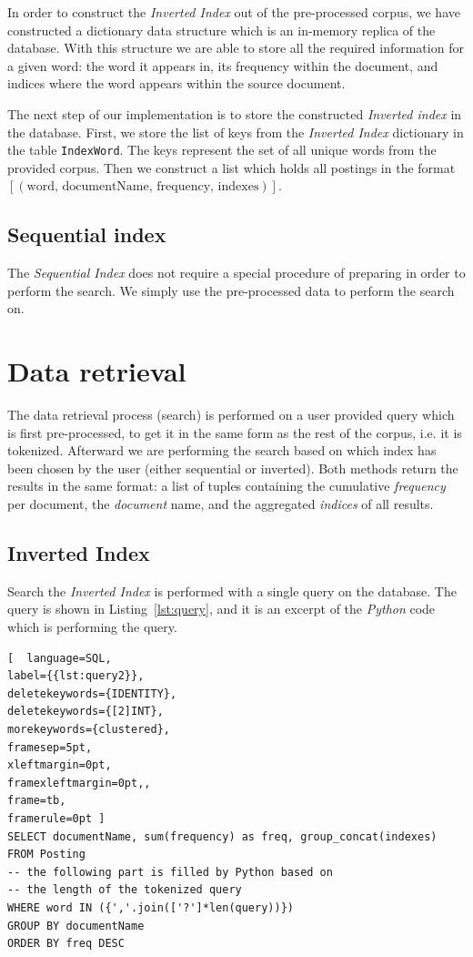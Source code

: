 \documentclass{article}
\begin{document}
In order to construct the \textit{Inverted Index} out of the pre-processed corpus, we have constructed a dictionary data structure which is an in-memory replica of the database. With this structure we are able to store all the required information for a given word: the word it appears in, its frequency within the document, and indices where the word appears within the source document.

The next step of our implementation is to store the constructed \textit{Inverted index} in the database. First, we store the list of keys from the \textit{Inverted Index} dictionary in the table \texttt{IndexWord}. The keys represent the set of all unique words from the provided corpus. Then we construct a list which holds all postings in the format \newline \texttt{$[(\mbox{word, documentName, frequency, indexes})]$}.

\subsection{Sequential index}

The \textit{Sequential Index} does not require a special procedure of preparing in order to perform the search. We simply use the pre-processed data to perform the search on.

\section{Data retrieval}
The data retrieval process (search) is performed on a user provided query which is first pre-processed, to get it in the same form as the rest of the corpus, i.e. it is tokenized. Afterward we are performing the search based on which index has been chosen by the user (either sequential or inverted). Both methods return the results in the same format: a list of tuples containing the cumulative \textit{frequency} per document, the \textit{document} name, and the aggregated \textit{indices} of all results.

\subsection{Inverted Index}
Search the \textit{Inverted Index} is performed with a single query on the database. The query is shown in Listing~\ref{lst:query}, and it is an excerpt of the \textit{Python} code which is performing the query.

\begin{lstlisting}[  language=SQL,
label={{lst:query2}},
deletekeywords={IDENTITY},
deletekeywords={[2]INT},
morekeywords={clustered},
framesep=5pt,
xleftmargin=0pt,
framexleftmargin=0pt,,
frame=tb,
framerule=0pt ]
SELECT documentName, sum(frequency) as freq, group_concat(indexes)
FROM Posting
-- the following part is filled by Python based on
-- the length of the tokenized query
WHERE word IN ({','.join(['?']*len(query))})
GROUP BY documentName
ORDER BY freq DESC
\end{lstlisting}
\end{document}
